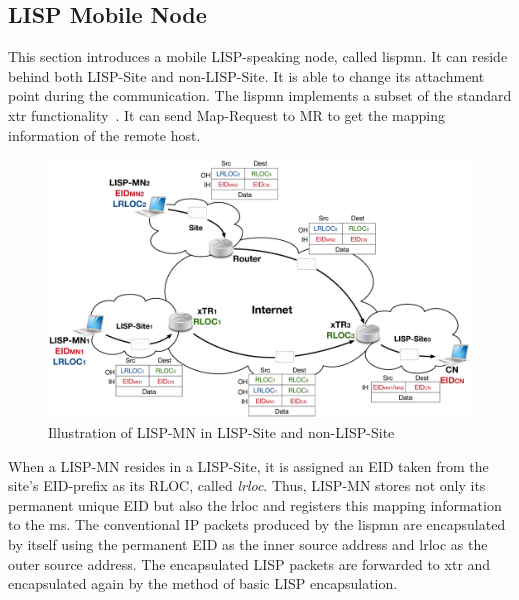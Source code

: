 \subsection{LISP Mobile Node}
\label{subsec:lispMN}
This section introduces a mobile LISP-speaking node, called \acrfull{lispmn}. It can reside behind both LISP-Site and non-LISP-Site. It is able to change its attachment point during the communication. The \acrshort{lispmn} implements a subset of the standard \acrshort{xtr} functionality~\cite{mn00}. It can send Map-Request to MR to get the mapping information of the remote host.

\begin{figure}[!t]
	\centering
	\includegraphics[width=\textwidth]{Pics/LISP-MN_archi.eps}
	\caption{Illustration of LISP-MN in LISP-Site and non-LISP-Site}
	\label{LISP_archi_2encap}
\end{figure}
When a LISP-MN resides in a LISP-Site, it is assigned an EID taken from the site's EID-prefix as its RLOC, called \emph{\acrfull{lrloc}}. Thus, LISP-MN stores not only its permanent unique EID but also the \acrshort{lrloc} and registers this mapping information to the \acrshort{ms}. The conventional IP packets produced by the \acrshort{lispmn} are encapsulated by itself using the permanent EID as the inner source address and \acrshort{lrloc} as the outer source address. The encapsulated LISP packets are forwarded to \acrshort{xtr} and encapsulated again by the method of basic LISP encapsulation. %


